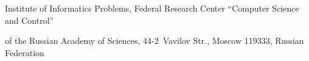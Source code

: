 \titel{\tit}{\aut}{\autkol}{\titkol}





\vspace*{-11pt}














\noindent


Institute of Informatics Problems, Federal Research Center ``Computer Science and Control''


 of the Russian Academy of Sciences, 44-2~Vavilov Str., Moscow 119333, Russian Federation





 


\def\leftfootline{\small{\textbf{\thepage}


\hfill INFORMATIKA I EE PRIMENENIYA~--- INFORMATICS AND


APPLICATIONS\ \ \ 2021\ \ \ volume~15\ \ \ issue\ 2}


}%


\def\rightfootline{\small{INFORMATIKA I EE PRIMENENIYA~---


INFORMATICS AND APPLICATIONS\ \ \ 2021\ \ \ volume~15\ \ \ issue\ 2


\hfill \textbf{\thepage}}}





\vspace*{3pt}














